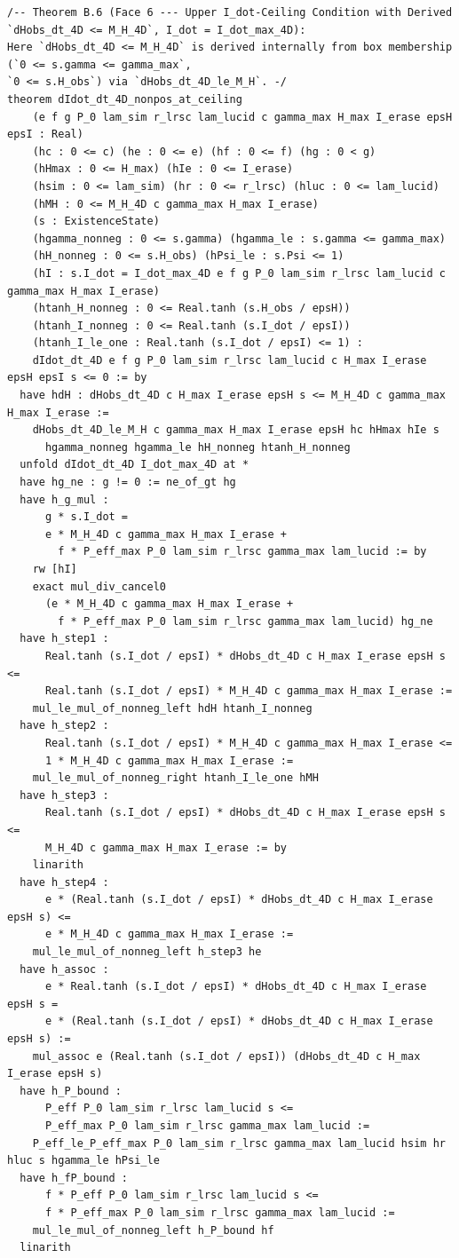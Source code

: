\documentclass[11pt,a4paper]{article}
\theoremstyle{definition}
\begin{document}
\begin{lstlisting}[language=Lean4]
/-- Theorem B.6 (Face 6 --- Upper I_dot-Ceiling Condition with Derived `dHobs_dt_4D <= M_H_4D`, I_dot = I_dot_max_4D):
Here `dHobs_dt_4D <= M_H_4D` is derived internally from box membership (`0 <= s.gamma <= gamma_max`,
`0 <= s.H_obs`) via `dHobs_dt_4D_le_M_H`. -/
theorem dIdot_dt_4D_nonpos_at_ceiling
    (e f g P_0 lam_sim r_lrsc lam_lucid c gamma_max H_max I_erase epsH epsI : Real)
    (hc : 0 <= c) (he : 0 <= e) (hf : 0 <= f) (hg : 0 < g)
    (hHmax : 0 <= H_max) (hIe : 0 <= I_erase)
    (hsim : 0 <= lam_sim) (hr : 0 <= r_lrsc) (hluc : 0 <= lam_lucid)
    (hMH : 0 <= M_H_4D c gamma_max H_max I_erase)
    (s : ExistenceState)
    (hgamma_nonneg : 0 <= s.gamma) (hgamma_le : s.gamma <= gamma_max)
    (hH_nonneg : 0 <= s.H_obs) (hPsi_le : s.Psi <= 1)
    (hI : s.I_dot = I_dot_max_4D e f g P_0 lam_sim r_lrsc lam_lucid c gamma_max H_max I_erase)
    (htanh_H_nonneg : 0 <= Real.tanh (s.H_obs / epsH))
    (htanh_I_nonneg : 0 <= Real.tanh (s.I_dot / epsI))
    (htanh_I_le_one : Real.tanh (s.I_dot / epsI) <= 1) :
    dIdot_dt_4D e f g P_0 lam_sim r_lrsc lam_lucid c H_max I_erase epsH epsI s <= 0 := by
  have hdH : dHobs_dt_4D c H_max I_erase epsH s <= M_H_4D c gamma_max H_max I_erase :=
    dHobs_dt_4D_le_M_H c gamma_max H_max I_erase epsH hc hHmax hIe s
      hgamma_nonneg hgamma_le hH_nonneg htanh_H_nonneg
  unfold dIdot_dt_4D I_dot_max_4D at *
  have hg_ne : g != 0 := ne_of_gt hg
  have h_g_mul :
      g * s.I_dot =
      e * M_H_4D c gamma_max H_max I_erase +
        f * P_eff_max P_0 lam_sim r_lrsc gamma_max lam_lucid := by
    rw [hI]
    exact mul_div_cancel0
      (e * M_H_4D c gamma_max H_max I_erase +
        f * P_eff_max P_0 lam_sim r_lrsc gamma_max lam_lucid) hg_ne
  have h_step1 :
      Real.tanh (s.I_dot / epsI) * dHobs_dt_4D c H_max I_erase epsH s <=
      Real.tanh (s.I_dot / epsI) * M_H_4D c gamma_max H_max I_erase :=
    mul_le_mul_of_nonneg_left hdH htanh_I_nonneg
  have h_step2 :
      Real.tanh (s.I_dot / epsI) * M_H_4D c gamma_max H_max I_erase <=
      1 * M_H_4D c gamma_max H_max I_erase :=
    mul_le_mul_of_nonneg_right htanh_I_le_one hMH
  have h_step3 :
      Real.tanh (s.I_dot / epsI) * dHobs_dt_4D c H_max I_erase epsH s <=
      M_H_4D c gamma_max H_max I_erase := by
    linarith
  have h_step4 :
      e * (Real.tanh (s.I_dot / epsI) * dHobs_dt_4D c H_max I_erase epsH s) <=
      e * M_H_4D c gamma_max H_max I_erase :=
    mul_le_mul_of_nonneg_left h_step3 he
  have h_assoc :
      e * Real.tanh (s.I_dot / epsI) * dHobs_dt_4D c H_max I_erase epsH s =
      e * (Real.tanh (s.I_dot / epsI) * dHobs_dt_4D c H_max I_erase epsH s) :=
    mul_assoc e (Real.tanh (s.I_dot / epsI)) (dHobs_dt_4D c H_max I_erase epsH s)
  have h_P_bound :
      P_eff P_0 lam_sim r_lrsc lam_lucid s <=
      P_eff_max P_0 lam_sim r_lrsc gamma_max lam_lucid :=
    P_eff_le_P_eff_max P_0 lam_sim r_lrsc gamma_max lam_lucid hsim hr hluc s hgamma_le hPsi_le
  have h_fP_bound :
      f * P_eff P_0 lam_sim r_lrsc lam_lucid s <=
      f * P_eff_max P_0 lam_sim r_lrsc gamma_max lam_lucid :=
    mul_le_mul_of_nonneg_left h_P_bound hf
  linarith


\end{lstlisting}
\end{document}
